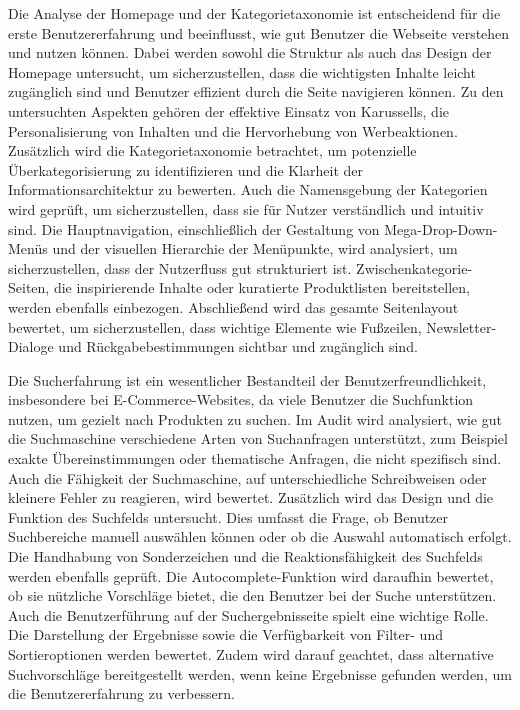 Die Analyse der Homepage und der Kategorietaxonomie ist entscheidend für die erste Benutzererfahrung und beeinflusst, wie gut Benutzer die Webseite verstehen und nutzen können. Dabei werden sowohl die Struktur als auch das Design der Homepage untersucht, um sicherzustellen, dass die wichtigsten Inhalte leicht zugänglich sind und Benutzer effizient durch die Seite navigieren können. Zu den untersuchten Aspekten gehören der effektive Einsatz von Karussells, die Personalisierung von Inhalten und die Hervorhebung von Werbeaktionen. Zusätzlich wird die Kategorietaxonomie betrachtet, um potenzielle Überkategorisierung zu identifizieren und die Klarheit der Informationsarchitektur zu bewerten. Auch die Namensgebung der Kategorien wird geprüft, um sicherzustellen, dass sie für Nutzer verständlich und intuitiv sind. Die Hauptnavigation, einschließlich der Gestaltung von Mega-Drop-Down-Menüs und der visuellen Hierarchie der Menüpunkte, wird analysiert, um sicherzustellen, dass der Nutzerfluss gut strukturiert ist. Zwischenkategorie-Seiten, die inspirierende Inhalte oder kuratierte Produktlisten bereitstellen, werden ebenfalls einbezogen. Abschließend wird das gesamte Seitenlayout bewertet, um sicherzustellen, dass wichtige Elemente wie Fußzeilen, Newsletter-Dialoge und Rückgabebestimmungen sichtbar und zugänglich sind.

Die Sucherfahrung ist ein wesentlicher Bestandteil der Benutzerfreundlichkeit, insbesondere bei E-Commerce-Websites, da viele Benutzer die Suchfunktion nutzen, um gezielt nach Produkten zu suchen. Im Audit wird analysiert, wie gut die Suchmaschine verschiedene Arten von Suchanfragen unterstützt, zum Beispiel exakte Übereinstimmungen oder thematische Anfragen, die nicht spezifisch sind. Auch die Fähigkeit der Suchmaschine, auf unterschiedliche Schreibweisen oder kleinere Fehler zu reagieren, wird bewertet. Zusätzlich wird das Design und die Funktion des Suchfelds untersucht. Dies umfasst die Frage, ob Benutzer Suchbereiche manuell auswählen können oder ob die Auswahl automatisch erfolgt. Die Handhabung von Sonderzeichen und die Reaktionsfähigkeit des Suchfelds werden ebenfalls geprüft. Die Autocomplete-Funktion wird daraufhin bewertet, ob sie nützliche Vorschläge bietet, die den Benutzer bei der Suche unterstützen. Auch die Benutzerführung auf der Suchergebnisseite spielt eine wichtige Rolle. Die Darstellung der Ergebnisse sowie die Verfügbarkeit von Filter- und Sortieroptionen werden bewertet. Zudem wird darauf geachtet, dass alternative Suchvorschläge bereitgestellt werden, wenn keine Ergebnisse gefunden werden, um die Benutzererfahrung zu verbessern.

